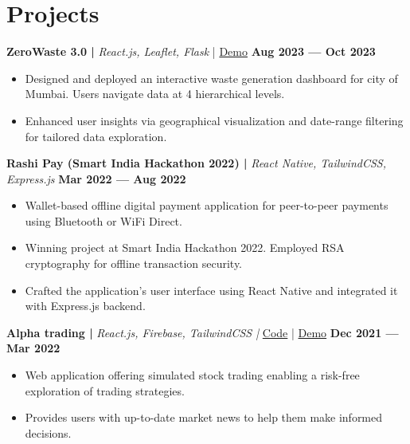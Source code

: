 \documentclass[a4,10pt]{article}
\newenvironment{zitemize}{
\begin{itemize}\itemsep0pt \parskip0pt \parsep1pt}
{\end{itemize}\vspace{-0.5cm}}
\begin{document}
\section{Projects}
\vspace{-0.1cm}
\textbf{ZeroWaste 3.0 | } \emph{React.js, Leaflet, Flask}
            | 
            {\href{https://effulgent-froyo-ab5141.netlify.app/}{
            \color{UI_blue} Demo} } \textbf{\hfill Aug 2023 --- Oct 2023} 
\vspace{-0.2cm}
    \begin{zitemize}
        \item Designed and deployed an interactive waste generation dashboard for city of Mumbai. Users navigate data at 4 hierarchical levels.
        \item Enhanced user insights via geographical visualization and date-range filtering for tailored data exploration.
    \end{zitemize}
\vspace{0.4cm}
\textbf{Rashi Pay (Smart India Hackathon 2022) | } \emph{React Native, TailwindCSS, Express.js} \textbf{\hfill Mar 2022 --- Aug 2022}
\vspace{-0.2cm}
    \begin{zitemize}
        \item Wallet-based offline digital payment application for peer-to-peer payments using Bluetooth or WiFi Direct.
        \item Winning project at Smart India Hackathon 2022. Employed RSA cryptography for offline transaction security.
        \item Crafted the application's user interface using React Native and integrated it with Express.js backend.
    \end{zitemize}
    
    
\vspace{0.4cm}
\textbf{Alpha trading | } \emph{React.js, Firebase, TailwindCSS |  }{\href{https://github.com/Harsh-H-Shah/Alpha-trading}{
            \color{UI_blue} Code}}
            | 
            {\href{https://alpha-trading.netlify.app/}{
            \color{UI_blue} Demo} } \textbf{\hfill Dec 2021 --- Mar 2022} 
\vspace{-0.2cm}
    \begin{zitemize}
        \item Web application offering simulated stock trading enabling a risk-free exploration of trading strategies.
        \item Provides users with up-to-date market news to help them make informed decisions.
    \end{zitemize}
\end{document}
